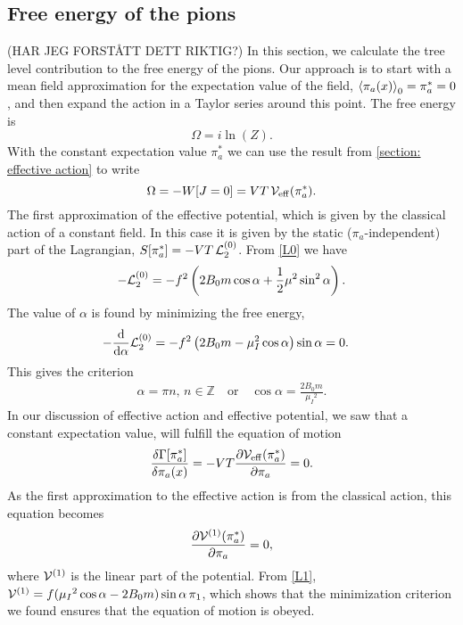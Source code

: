 \subsection{Free energy of the pions}
(HAR JEG FORSTÅTT DETT RIKTIG?)
In this section, we calculate the tree level contribution to the free energy of the pions.
Our approach is to start with a mean field approximation for the expectation value of the field, $\ex{\pi_a(x)}_0 = \pi^*_a = 0$, and then expand the action in a Taylor series around this point.
The free energy is 
\begin{equation}
    \Omega = i \ln(Z).
\end{equation}
With the constant expectation value $\pi^*_a$ we can use the result from \autoref{section: effective action} to write
\begin{equation}
    \Omega = -W[J=0] = V T \, \mathcal{V}_{\mathrm{eff}}(\pi^*_a).
\end{equation}
The first approximation of the effective potential, which is given by the classical action of a constant field.
In this case it is given by the static ($\pi_a$-independent) part of the Lagrangian, $S[\pi^*_a] = -V T \, \mathcal{L}_2^{(0)}$.
From \autoref{L0} we have
\begin{equation}
    - \mathcal{L}_2^{(0)} = 
    -f^2   
    \left(
        2B_0m \cos{\alpha}
        + \frac{1}{2} \mu^2 \sin^2{\alpha}
    \right).
\end{equation}
The value of $\alpha$ is found by minimizing the free energy,
\begin{align*}
    -&\dv{\alpha} \mathcal{L}_2^{(0)} 
    = - f^2\left(2B_0m - \mu_I^2\cos{\alpha}\right)\sin{\alpha}
    = 0.
\end{align*}
This gives the criterion
\begin{align}
    \alpha = \pi n, \, n \in \mathbb{Z} \quad
    \mathrm{or} \quad
    \cos{\alpha} = \frac{2B_0m}{\mu_I{}^2}.
\end{align}
In our discussion of effective action and effective potential, we saw that a constant expectation value, will fulfill the equation of motion
\begin{equation}
    \frac{\delta \Gamma[\pi^*_a]}{\delta \pi_a(x)}
    = - V T \pdv{\mathcal{V}_{\mathrm{eff}}(\pi^*_a)}{\pi_a} = 0.
\end{equation}
As the first approximation to the effective action is from the classical action, this equation becomes
\begin{equation}
    \pdv{\mathcal{V}^{(1)}(\pi^*_a)}{\pi_a} = 0,
\end{equation}
where $\mathcal{V}^{(1)}$ is the linear part of the potential. 
From \autoref{L1}, $\mathcal{V}^{(1)} = f(\mu_I{}^2\cos{\alpha} - 2B_0m)\sin{\alpha} \, \pi_1 $, which shows that the minimization criterion we found ensures that the equation of motion is obeyed.

